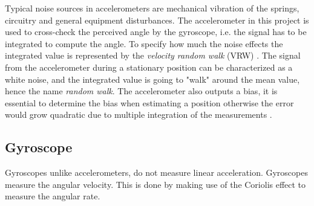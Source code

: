\documentclass[a4paper,11pt]{kth-mag}
\begin{document}
Typical noise sources in accelerometers are mechanical vibration of the springs, circuitry and general equipment disturbances. The accelerometer in this project is used to cross-check the perceived angle by the gyroscope, i.e. the signal has to be integrated to compute the angle. To specify how much the noise effects the integrated value is represented 
by the \textit{velocity random walk} (VRW) \cite{ARW}. The signal from the accelerometer during a stationary position can be characterized as a white noise, and the integrated value is going to "walk" around the mean value, hence the name \textit{random walk}.
The accelerometer also outputs a bias, it is essential to determine the bias when estimating a position otherwise the error would grow quadratic due to multiple integration of the measurements \cite{ref:accelerometero}.

\subsection{Gyroscope} \label{gyroscope}
Gyroscopes unlike accelerometers, do not measure linear acceleration. Gyroscopes measure the angular velocity. This is done by making use of the Coriolis effect to measure the angular rate.
\end{document}
